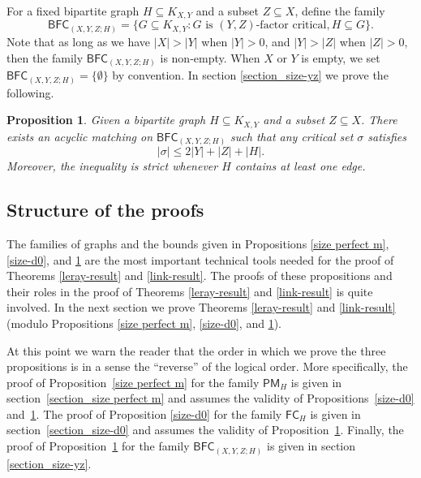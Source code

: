 \documentclass[10pt]{amsart}
\newtheorem{prop}[thm]{Proposition}
\theoremstyle{definition}
\begin{document}
	For a fixed bipartite graph $H\subseteq K_{X,Y}$ and a subset $Z\subseteq X$, define the family
	\[\mathsf{BFC}_{(X,Y,Z; H)} = \{G\subseteq K_{X,Y}: G \text{ is $(Y,Z)$-factor critical}, H\subseteq G\}.\]
	Note that as long as we have $|X|>|Y|$ when $|Y|>0$, and $|Y|>|Z|$ when $|Z|>0$, then the family $\mathsf{BFC}_{(X,Y,Z; H)}$ is non-empty. When $X$ or $Y$ is empty, we set $\mathsf{BFC}_{(X,Y,Z; H)}=\{\emptyset \}$ by convention.
	In section \ref{section_size-yz} we prove the following.
	
	\begin{prop}\label{size-yz}
		Given a bipartite graph $H\subseteq K_{X,Y}$ and a subset $Z\subseteq X$. There exists an acyclic matching on $\mathsf{BFC}_{(X,Y,Z; H)}$ such that any critical set $\sigma$ satisfies 
		\[|\sigma|\leq 2|Y|+|Z| + |H|.\]
		Moreover, the inequality is strict whenever $H$ contains at least one edge.
	\end{prop}
	
	
	
	
	
	
	\subsection{Structure of the proofs}\label{section_outline}
	
	The families of graphs and the bounds given in Propositions \ref{size perfect m}, \ref{size-d0}, and \ref{size-yz} are the most important technical tools needed for the proof of Theorems \ref{leray-result} and \ref{link-result}. The proofs of these propositions and their roles in the proof of Theorems \ref{leray-result} and \ref{link-result} is quite involved. In the next section we prove Theorems \ref{leray-result} and \ref{link-result} (modulo Propositions \ref{size perfect m}, \ref{size-d0}, and \ref{size-yz}). 
	
	\smallskip
	
	At this point we warn the reader that the order in which we prove the three propositions is in a sense the ``reverse'' of the logical order. More specifically, the proof of Proposition~\ref{size perfect m} for the family $\mathsf{PM}_H$ is given in section~\ref{section_size perfect m} and assumes the validity of Propositions~\ref{size-d0} and~\ref{size-yz}.
	The proof of Proposition \ref{size-d0} for the family $\mathsf{FC}_H$ is given in section~\ref{section_size-d0} and assumes the validity of Proposition~\ref{size-yz}. Finally, the proof of Proposition~\ref{size-yz} for the family $\mathsf{BFC}_{(X,Y,Z;H)}$ is given in section \ref{section_size-yz}.
	
\end{document}
